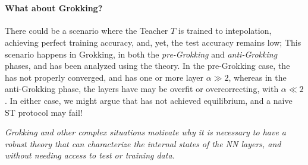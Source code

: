 \


\paragraph{What about Grokking?} There could be a scenario where the Teacher $T$ is trained to intepolation, achieving perfect training accuracy, and, yet, the test accuracy remains low;
This scenario happens in Grokking,  in both the \emph{pre-Grokking} and \emph{anti-Grokking} 
phases, and has been analyzed using the \HTSR theory.\cite{prakash2025grokking}  
In the pre-Grokking case,  the \Teacher has not properly converged, and has one or more
layer $\alpha\gg 2$, whereas in the anti-Grokking phase, the layers have may be overfit
or overcorrecting, with $\alpha\ll 2$. In either case, we might argue that \Teacher has not 
achieved \Thermodynamic equilibrium, and a naive ST protocol may fail!

\emph{Grokking and other complex situations motivate why it is necessary to have a robust theory that
can characterize the internal states of the NN layers, and without needing access to test or training data.}
